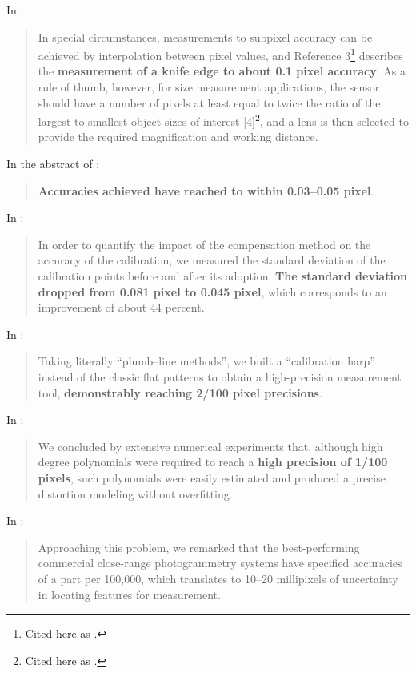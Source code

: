 \documentclass[a4paper,12pt]{article}
\begin{document}
In \cite{eren2014measurement}:
\begin{quotation}
In special circumstances, measurements to subpixel accuracy can be achieved by
interpolation between pixel values, and Reference 3\footnote{Cited here as \cite{knives}.} describes the \textbf{measurement of a knife edge to about
0.1 pixel accuracy}. As a rule of thumb, however, for size measurement applications, the sensor should
have a number of pixels at least equal to twice the ratio of the largest to smallest object sizes of interest
[4]\footnote{Cited here as \cite{hopwood1980design}.}, and a lens is then selected to provide the required magnification and working distance.
\end{quotation}

In the abstract of \cite{MIKHAIL198463}:
\begin{quotation}
\textbf{Accuracies achieved have reached to within 0.03--0.05 pixel}.
\end{quotation}

In \cite{632986}:
\begin{quotation}
In order to quantify the impact of the compensation method on
the accuracy of the calibration, we measured the standard deviation
of the calibration points before and after its adoption. \textbf{The
standard deviation dropped from 0.081 pixel to 0.045 pixel}, which
corresponds to an improvement of about 44 percent.
\end{quotation}

In \cite{Tang:12}:
\begin{quotation}
Taking literally ``plumb--line methods'', we built a ``calibration harp'' instead of the classic 
flat patterns to obtain a high-precision measurement tool, \textbf{demonstrably reaching 
2/100 pixel precisions}. 
\end{quotation}

In \cite{7885103}:
\begin{quotation}
We concluded by extensive numerical experiments that, although high degree polynomials were 
required to reach a \textbf{high precision of 1/100 pixels}, such polynomials were easily 
estimated and produced a precise distortion modeling without overfitting.
\end{quotation}

In \cite{gutierrez2007precision}:
\begin{quotation}
Approaching this problem,
we remarked that the best-performing commercial close-range photogrammetry systems have 
specified accuracies of a part per 100,000, which translates to 10–20 millipixels of 
uncertainty in locating features for measurement.
\end{quotation}
\end{document}
